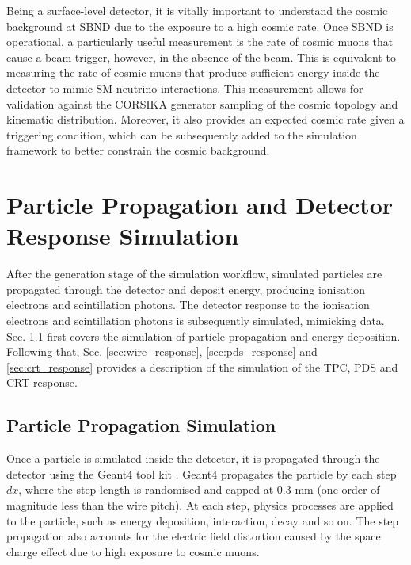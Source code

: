 Being a surface-level detector, it is vitally important to understand the cosmic background at SBND due to the exposure to a high cosmic rate.
Once SBND is operational, a particularly useful measurement is the rate of cosmic muons that cause a beam trigger, however, in the absence of the beam.
This is equivalent to measuring the rate of cosmic muons that produce sufficient energy inside the detector to mimic SM neutrino interactions.
This measurement allows for validation against the CORSIKA generator sampling of the cosmic topology and kinematic distribution. 
Moreover, it also provides an expected cosmic rate given a triggering condition, which can be subsequently added to the simulation framework to better constrain the cosmic background.                

\section{Particle Propagation and Detector Response Simulation}
\label{sec:gen_response}


After the generation stage of the simulation workflow, simulated particles are propagated through the detector and deposit energy, producing ionisation electrons and scintillation photons.
The detector response to the ionisation electrons and scintillation photons is subsequently simulated, mimicking data. 
Sec. \ref{sec:gen_g4} first covers the simulation of particle propagation and energy deposition.
Following that, Sec. \ref{sec:wire_response}, \ref{sec:pds_response} and \ref{sec:crt_response} provides a description of the simulation of the TPC, PDS and CRT response. 

\subsection{Particle Propagation Simulation}
\label{sec:gen_g4}

Once a particle is simulated inside the detector, it is propagated through the detector using the Geant4 tool kit \cite{geant4}.
Geant4 propagates the particle by each step $dx$, where the step length is randomised and capped at 0.3 mm (one order of magnitude less than the wire pitch).
At each step, physics processes are applied to the particle, such as energy deposition, interaction, decay and so on.
The step propagation also accounts for the electric field distortion caused by the space charge effect due to high exposure to cosmic muons.

